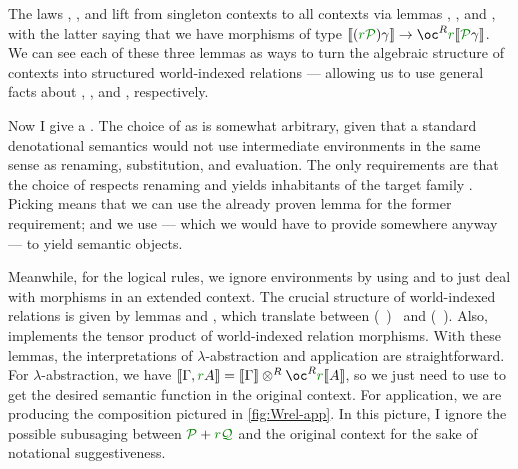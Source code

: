 
The laws , , and  lift
from singleton contexts to all contexts via lemmas ,
, and , with the latter saying that we
have morphisms of type
\mbox{$\sem{\plr{\gr r\grP}\gamma} \to \oc^R\gr r\sem{\grP\gamma}$}.
We can see each of these three lemmas as ways to turn the algebraic structure of
contexts into structured world-indexed relations --- allowing us to use general
facts about , , and
, respectively.

Now I give a .
The choice of \AgdaBound{$\V$} as
\AgdaRecord{\AgdaUnderscore{}$\sqni$\AgdaUnderscore{}} is somewhat arbitrary,
given that a standard denotational semantics would not use intermediate
environments in the same sense as renaming, substitution, and evaluation.
The only requirements are that the choice of \AgdaBound{$\V$} respects renaming
and yields inhabitants of the target family
\AgdaFunction{$\llbracket$\_$\vdash$\_$\rrbracket$}.
Picking \AgdaRecord{\_$\sqni$\_} means that we can use the already proven lemma
 for the former requirement; and we use
 --- which we would have to provide somewhere anyway
--- to yield semantic objects.

Meanwhile, for the logical rules, we ignore environments by using
 and  to just deal with morphisms in
an extended context.
The crucial structure of world-indexed relations is given by lemmas
 and , which translate between
\mbox{\AgdaSpace{}\AgdaSymbol(\AgdaSpace{}%
\AgdaSpace{}\AgdaSymbol)%
\AgdaSpace{}} and
\mbox{\AgdaSpace{}\AgdaSpace{}\AgdaSymbol(%
\AgdaSpace{}\AgdaSpace{}%
\AgdaSymbol)}.
Also,  implements the tensor
product of world-indexed relation morphisms.
With these lemmas, the interpretations of $\lambda$-abstraction and application
are straightforward.
For $\lambda$-abstraction, we have
\mbox{$\sem{\Gamma, \gr rA} = \sem\Gamma \otimes^R \oc^R\gr r\sem{A}$},
so we just need to use  to get the desired semantic
function in the original context.
For application, we are producing the composition pictured in
\cref{fig:Wrel-app}.
In this picture, I ignore the possible subusaging between $\grP + \gr r\grQ$ and
the original context for the sake of notational suggestiveness.

